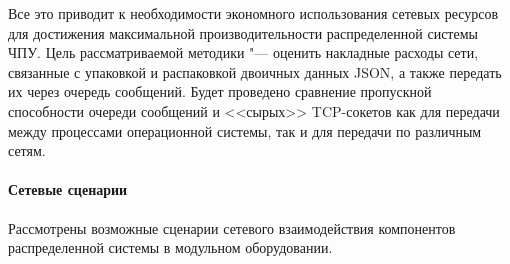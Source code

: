 Все это приводит к необходимости экономного использования сетевых ресурсов для достижения максимальной производительности распределенной системы ЧПУ. Цель рассматриваемой методики "--- оценить накладные расходы сети, связанные с упаковкой и распаковкой двоичных данных JSON, а также передать их через очередь сообщений. Будет проведено сравнение пропускной способности очереди сообщений и <<сырых>> TCP-сокетов как для передачи между процессами операционной системы, так и для передачи по различным сетям.

\paragraph{Сетевые сценарии}

Рассмотрены возможные сценарии сетевого взаимодействия компонентов распределенной системы в модульном оборудовании.

